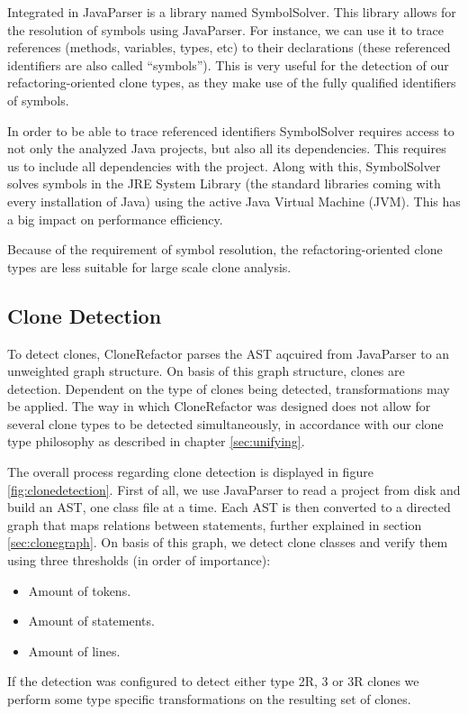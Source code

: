 Integrated in JavaParser is a library named SymbolSolver. This library allows for the resolution of symbols using JavaParser. For instance, we can use it to trace references (methods, variables, types, etc) to their declarations (these referenced identifiers are also called ``symbols''). This is very useful for the detection of our refactoring-oriented clone types, as they make use of the fully qualified identifiers of symbols.

In order to be able to trace referenced identifiers SymbolSolver requires access to not only the analyzed Java projects, but also all its dependencies. This requires us to include all dependencies with the project. Along with this, SymbolSolver solves symbols in the JRE System Library (the standard libraries coming with every installation of Java) using the active Java Virtual Machine (JVM). This has a big impact on performance efficiency.

Because of the requirement of symbol resolution, the refactoring-oriented clone types are less suitable for large scale clone analysis.

\subsection{Clone Detection}\label{sec:clonedetection}
To detect clones, CloneRefactor parses the AST aqcuired from JavaParser to an unweighted graph structure. On basis of this graph structure, clones are detection. Dependent on the type of clones being detected, transformations may be applied. The way in which CloneRefactor was designed does not allow for several clone types to be detected simultaneously, in accordance with our clone type philosophy as described in chapter \ref{sec:unifying}.

The overall process regarding clone detection is displayed in figure \ref{fig:clonedetection}. First of all, we use JavaParser to read a project from disk and build an AST, one class file at a time. Each AST is then converted to a directed graph that maps relations between statements, further explained in section \ref{sec:clonegraph}. On basis of this graph, we detect clone classes and verify them using three thresholds (in order of importance):
\begin{itemize}
  \item Amount of tokens.
  \item Amount of statements.
  \item Amount of lines.
\end{itemize}
If the detection was configured to detect either type 2R, 3 or 3R clones we perform some type specific transformations on the resulting set of clones.

